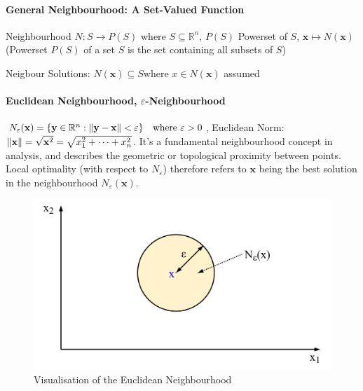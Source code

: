\documentclass[11pt]{article}
\DeclarePairedDelimiter\norm{\lVert}{\rVert}
\begin{document}
\paragraph{General Neighbourhood: A Set-Valued Function} Neighbourhood $N: S \rightarrow P(S)$ where $S\subseteq \mathbb{R}^n$, $P(S)$ Powerset of $S$, $\textbf{x} \mapsto N(\textbf{x})$ (Powerset $P(S)$ of a set $S$ is the set containing all subsets of $S$)

Neigbour Solutions: $N(\textbf{x}) \subseteq S$\quad where $x\in N(\textbf{x})$ assumed

\paragraph{Euclidean Neighbourhood, $\varepsilon$-Neighbourhood} $N_\varepsilon (\textbf{x})=\{\textbf{y}\in\mathbb{R}^n:\norm{\textbf{y}-\textbf{x}}<\varepsilon\} \quad \text{where }\varepsilon>0$, Euclidean Norm: $\norm{\textbf{x}} = \sqrt{\textbf{x}^2} = \sqrt{x_1^2+\dots+x_n^2}$. It's a fundamental neighbourhood concept in analysis, and describes the geometric or topological proximity between points. Local optimality (with respect to $N_\varepsilon$) therefore refers to $\textbf{x}$ being the best solution in the neighbourhood $N_\varepsilon(\textbf{x})$.

\begin{figure}[tbh]
	\centering
	\includegraphics[width=0.6\linewidth,keepaspectratio]{euclidean_neighbourhood}
	\caption{Visualisation of the Euclidean Neighbourhood}
	\label{fig:euclideanneighbourhood}
\end{figure}
\end{document}

